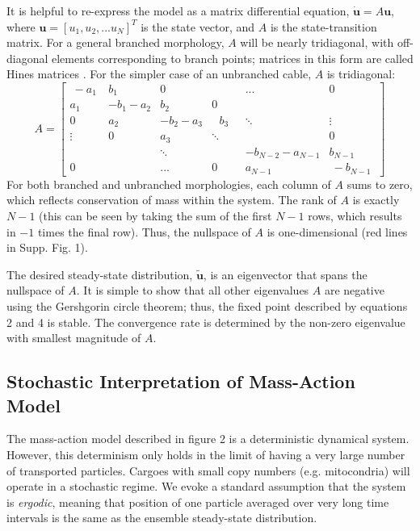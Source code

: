 \documentclass[11pt]{wlpeerj}
\begin{document}
It is helpful to re-express the model as a matrix differential equation, $\mathbf{\dot{u}} = A \mathbf{u}$, where $\mathbf{u} = \left[ u_1, u_2, ... u_N \right]^T$ is the state vector, and $A$ is the state-transition matrix. For a general branched morphology, $A$ will be nearly tridiagonal, with off-diagonal elements corresponding to branch points; matrices in this form are called Hines matrices \citep{Hines_1984}. For the simpler case of an unbranched cable, $A$ is tridiagonal:
$$
A = 
 \begin{bmatrix}
  ~-a_1~  & b_1      & 0         &         & ...              & 0        \\
   a_1    & -b_1-a_2 & b_2       &  0      &                  &          \\
   0      &  a_2     & -b_2-a_3  & ~~~ b_3~~~  & \ddots     & \vdots   \\
   \vdots &  0       & a_3       & \ddots  &                  & 0        \\
          &          & \ddots    &         & -b_{N-2}-a_{N-1} & b_{N-1}  \\
   0      &          & ...       &  0      & a_{N-1}          & ~-b_{N-1}~
 \end{bmatrix}
$$
For both branched and unbranched morphologies, each column of $A$ sums to zero, which reflects conservation of mass within the system. The rank of $A$ is exactly $N-1$ (this can be seen by taking the sum of the first $N-1$ rows, which results in $-1$ times the final row). Thus, the nullspace of $A$ is one-dimensional (red lines in Supp. Fig. 1).

The desired steady-state distribution, $\mathbf{\tilde{u}}$, is an eigenvector that spans the nullspace of $A$. It is simple to show that all other eigenvalues $A$ are negative using the Gershgorin circle theorem; thus, the fixed point described by equations 2 and 4 is stable. The convergence rate is determined by the non-zero eigenvalue with smallest magnitude of $A$. 

\subsection*{Stochastic Interpretation of Mass-Action Model}

The mass-action model described in figure 2 is a deterministic dynamical system. However, this determinism only holds in the limit of having a very large number of transported particles. Cargoes with small copy numbers (e.g. mitocondria) will operate in a stochastic regime. We evoke a standard assumption that the system is \textit{ergodic}, meaning that position of one particle averaged over very long time intervals is the same as the ensemble steady-state distribution. 
\end{document}
